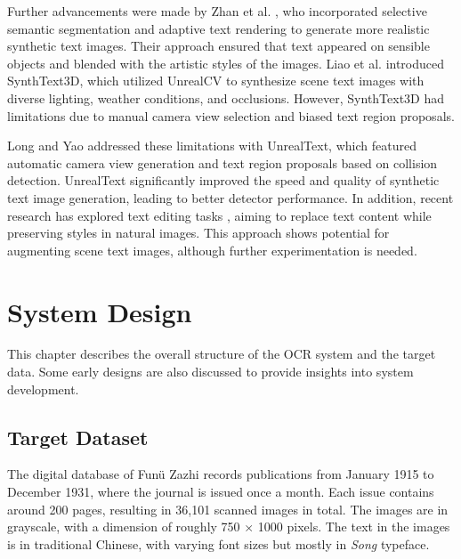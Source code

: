 \documentclass[12pt,twoside]{report}
\begin{document}
Further advancements were made by Zhan et al. \cite{zhan2018verisimilar}, who incorporated selective semantic segmentation and adaptive text rendering to generate more realistic synthetic text images. Their approach ensured that text appeared on sensible objects and blended with the artistic styles of the images. Liao et al. \cite{liao2020synthtext3d} introduced SynthText3D, which utilized UnrealCV to synthesize scene text images with diverse lighting, weather conditions, and occlusions. However, SynthText3D had limitations due to manual camera view selection and biased text region proposals.

Long and Yao \cite{long2020unrealtext} addressed these limitations with UnrealText, which featured automatic camera view generation and text region proposals based on collision detection. UnrealText significantly improved the speed and quality of synthetic text image generation, leading to better detector performance. In addition, recent research has explored text editing tasks \cite{wu2019editing,yang2020swaptext}, aiming to replace text content while preserving styles in natural images. This approach shows potential for augmenting scene text images, although further experimentation is needed.

\chapter{System Design}
This chapter describes the overall structure of the OCR system and the target data. Some early designs are also discussed to provide insights into system development.

\section{Target Dataset}
\label{sec:target_dataset}
The digital database of Funü Zazhi \cite{fnzzpages} records publications from January 1915 to December 1931, where the journal is issued once a month. Each issue contains around 200 pages, resulting in 36,101 scanned images in total. The images are in grayscale, with a dimension of roughly 750 $\times$ 1000 pixels. The text in the images is in traditional Chinese, with varying font sizes but mostly in \textit{Song} typeface.
\end{document}
